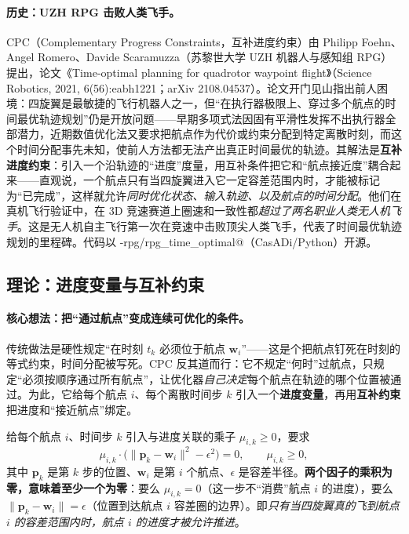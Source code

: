 \paragraph{历史：UZH RPG 击败人类飞手。}
CPC（Complementary Progress Constraints，互补进度约束）由 Philipp Foehn、Angel Romero、Davide Scaramuzza（苏黎世大学 UZH 机器人与感知组 RPG）提出，论文《Time-optimal planning for quadrotor waypoint flight》（Science Robotics, 2021, 6(56):eabh1221；arXiv 2108.04537）\cite{foehn2021cpc}。论文开门见山指出前人困境：四旋翼是最敏捷的飞行机器人之一，但“在执行器极限上、穿过多个航点的时间最优轨迹规划”仍是开放问题——早期多项式法因固有平滑性发挥不出执行器全部潜力，近期数值优化法又要求把航点作为代价或约束分配到特定离散时刻，而这个时间分配事先未知，使前人方法都无法产出真正时间最优的轨迹。其解法是\textbf{互补进度约束}：引入一个沿轨迹的“进度”度量，用互补条件把它和“航点接近度”耦合起来——直观说，一个航点只有当四旋翼进入它一定容差范围内时，才能被标记为“已完成”，这样就允许\emph{同时优化状态、输入轨迹、以及航点的时间分配}。他们在真机飞行验证中，在 3D 竞速赛道上圈速和一致性都\emph{超过了两名职业人类无人机飞手}\cite{foehn2021cpc}。这是无人机自主飞行第一次在竞速中击败顶尖人类飞手，代表了时间最优轨迹规划的里程碑。代码以 \verb@uzh-rpg/rpg_time_optimal@（CasADi/Python）开源。

\subsection{理论：进度变量与互补约束}
\label{sec:st-cpc-theory}

\paragraph{核心想法：把“通过航点”变成连续可优化的条件。}
传统做法是硬性规定“在时刻 $t_k$ 必须位于航点 $\mathbf w_i$”——这是个把航点钉死在时刻的等式约束，时间分配被写死。CPC 反其道而行：它不规定“何时”过航点，只规定“必须按顺序通过所有航点”，让优化器\emph{自己决定}每个航点在轨迹的哪个位置被通过。为此，它给每个航点 $i$、每个离散时间步 $k$ 引入一个\textbf{进度变量}，再用\textbf{互补约束}把进度和“接近航点”绑定。

\begin{definition}\label{def:st-cpc}
给每个航点 $i$、时间步 $k$ 引入与进度关联的乘子 $\mu_{i,k}\ge 0$，要求
\begin{equation}
  \mu_{i,k}\cdot\big(\|\mathbf p_k-\mathbf w_i\|^2-\epsilon^2\big)=0,\qquad \mu_{i,k}\ge 0,
  \label{eq:st-cpc}
\end{equation}
其中 $\mathbf p_k$ 是第 $k$ 步的位置、$\mathbf w_i$ 是第 $i$ 个航点、$\epsilon$ 是容差半径。\textbf{两个因子的乘积为零，意味着至少一个为零}：要么 $\mu_{i,k}=0$（这一步不“消费”航点 $i$ 的进度），要么 $\|\mathbf p_k-\mathbf w_i\|=\epsilon$（位置到达航点 $i$ 容差圈的边界）。即\emph{只有当四旋翼真的飞到航点 $i$ 的容差范围内时，航点 $i$ 的进度才被允许推进}。
\end{definition}

